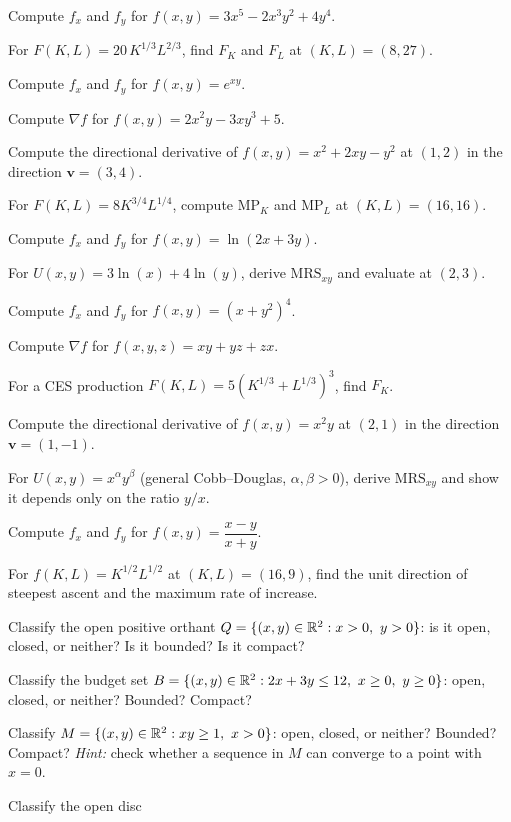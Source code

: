 \begin{problems}
  \item Compute $f_x$ and $f_y$ for $f(x,y)=3x^5-2x^3y^2+4y^4$.
  \item For $F(K,L)=20\,K^{1/3}L^{2/3}$, find $F_K$ and $F_L$ at
        $(K,L)=(8,27)$.
  \item Compute $f_x$ and $f_y$ for $f(x,y)=e^{xy}$.
  \item Compute $\nabla f$ for $f(x,y)=2x^2y-3xy^3+5$.
  \item Compute the directional derivative of $f(x,y)=x^2+2xy-y^2$ at
        $(1,2)$ in the direction $\mathbf{v}=(3,4)$.
  \item For $F(K,L)=8K^{3/4}L^{1/4}$, compute $\mathrm{MP}_K$ and
        $\mathrm{MP}_L$ at $(K,L)=(16,16)$.
  \item Compute $f_x$ and $f_y$ for $f(x,y)=\ln(2x+3y)$.
  \item For $U(x,y)=3\ln(x)+4\ln(y)$, derive $\mathrm{MRS}_{xy}$ and
        evaluate at $(2,3)$.
  \item Compute $f_x$ and $f_y$ for $f(x,y)=(x+y^2)^4$.
  \item Compute $\nabla f$ for $f(x,y,z)=xy+yz+zx$.
  \item For a CES production $F(K,L)=5(K^{1/3}+L^{1/3})^3$, find $F_K$.
  \item Compute the directional derivative of $f(x,y)=x^2y$ at $(2,1)$
        in the direction $\mathbf{v}=(1,-1)$.
  \item For $U(x,y)=x^\alpha y^\beta$ (general Cobb--Douglas,
        $\alpha,\beta>0$), derive $\mathrm{MRS}_{xy}$ and show it depends
        only on the ratio $y/x$.
  \item Compute $f_x$ and $f_y$ for $f(x,y)=\dfrac{x-y}{x+y}$.
  \item For $f(K,L)=K^{1/2}L^{1/2}$ at $(K,L)=(16,9)$, find the unit
        direction of steepest ascent and the maximum rate of increase.
  \item Classify the open positive orthant
        $Q=\{(x,y)\in\mathbb{R}^2 : x>0,\ y>0\}$: is it open, closed, or
        neither? Is it bounded? Is it compact?
  \item Classify the budget set
        $B=\{(x,y)\in\mathbb{R}^2 : 2x+3y\le12,\ x\ge0,\ y\ge0\}$: open,
        closed, or neither? Bounded? Compact?
  \item Classify $M=\{(x,y)\in\R^2 : xy\ge1,\ x>0\}$: open, closed, or
        neither? Bounded? Compact? \emph{Hint:} check whether a
        sequence in $M$ can converge to a point with $x=0$.
  \item Classify the open disc

\end{problems}
